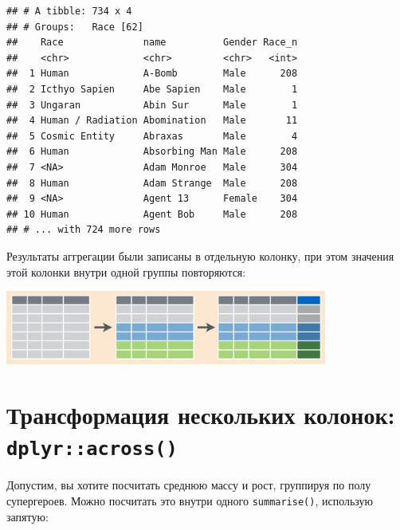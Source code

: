 \documentclass[
]{book}
\newenvironment{Shaded}{\begin{snugshade}}{\end{snugshade}}
\newcommand{\DataTypeTok}[1]{\textcolor[rgb]{0.13,0.29,0.53}{#1}}
\newcommand{\KeywordTok}[1]{\textcolor[rgb]{0.13,0.29,0.53}{\textbf{#1}}}
\newcommand{\NormalTok}[1]{#1}
\newcommand{\OperatorTok}[1]{\textcolor[rgb]{0.81,0.36,0.00}{\textbf{#1}}}
\newcommand{\OtherTok}[1]{\textcolor[rgb]{0.56,0.35,0.01}{#1}}
\newcommand{\StringTok}[1]{\textcolor[rgb]{0.31,0.60,0.02}{#1}}
\begin{document}
\begin{verbatim}
## # A tibble: 734 x 4
## # Groups:   Race [62]
##    Race              name          Gender Race_n
##    <chr>             <chr>         <chr>   <int>
##  1 Human             A-Bomb        Male      208
##  2 Icthyo Sapien     Abe Sapien    Male        1
##  3 Ungaran           Abin Sur      Male        1
##  4 Human / Radiation Abomination   Male       11
##  5 Cosmic Entity     Abraxas       Male        4
##  6 Human             Absorbing Man Male      208
##  7 <NA>              Adam Monroe   Male      304
##  8 Human             Adam Strange  Male      208
##  9 <NA>              Agent 13      Female    304
## 10 Human             Agent Bob     Male      208
## # ... with 724 more rows
\end{verbatim}

Результаты аггрегации были записаны в отдельную колонку, при этом значения этой колонки внутри одной группы повторяются:

\includegraphics[width=4.16667in,height=\textheight]{images/group_by_m.png}

\hypertarget{ux442ux440ux430ux43dux441ux444ux43eux440ux43cux430ux446ux438ux44f-ux43dux435ux441ux43aux43eux43bux44cux43aux438ux445-ux43aux43eux43bux43eux43dux43eux43a-dplyracross}{%
\section{\texorpdfstring{Трансформация нескольких колонок: \texttt{dplyr::across()}}{Трансформация нескольких колонок: dplyr::across()}}\label{ux442ux440ux430ux43dux441ux444ux43eux440ux43cux430ux446ux438ux44f-ux43dux435ux441ux43aux43eux43bux44cux43aux438ux445-ux43aux43eux43bux43eux43dux43eux43a-dplyracross}}

Допустим, вы хотите посчитать среднюю массу и рост, группируя по полу супергероев. Можно посчитать это внутри одного \texttt{summarise()}, использую запятую:

\begin{Shaded}
\end{Shaded}
\end{document}
